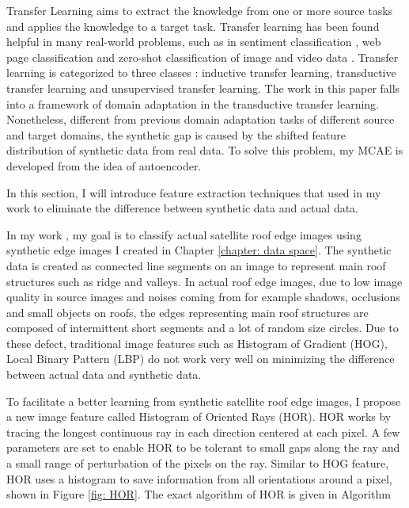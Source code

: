 \documentclass{iitthesis}
\begin{document}
Transfer Learning aims to extract the knowledge from one or more source tasks and applies the knowledge to a target task. Transfer learning has been found helpful in many real-world problems, such as in sentiment classification \cite{Blitzer07Biographies}, web page classification\textcolor{red}{{} }\cite{Sarinnapakorn:2007:CST:1313047.1313197} and zero-shot classification of image and video data \cite{lampert13AwAPAMI,lampert2009zeroshot_dat,yanweiPAMIlatentattrib,yao2011action_part,yanweiembedding,yanweiBMVC,RohrbachCVPR12,rohrbach2010semantic_transfer,RichardNIPS13}. Transfer learning is categorized to three classes \cite{pan2009transfer_survey}: inductive transfer learning, transductive transfer learning and unsupervised transfer learning. The work in this paper falls into a framework of domain adaptation \cite{Ben-David:2010:TLD:1745449.1745461,Weinberger:2009:FHL:1553374.1553516}
in the transductive transfer learning. Nonetheless, different from previous domain adaptation tasks of different source and target domains, the synthetic gap is caused by the shifted feature distribution of synthetic data from real data. To solve this problem, my MCAE is developed from the idea of autoencoder.


In this section, I will introduce feature extraction techniques that used in my work to eliminate the difference between synthetic data and actual data.

 In my work \cite{AndiZang2015}, my goal is to classify actual satellite roof edge images using synthetic edge images I created in Chapter \ref{chapter: data space}. The synthetic data is created as connected line segments on an image to represent main roof structures such as ridge and valleys. In actual roof edge images, due to low image quality in source images and noises coming from for example shadows, occlusions and small objects on roofs, the edges representing main roof structures are composed of intermittent short segments and a lot of random size circles. Due to these defect, traditional image features such as Histogram of Gradient (HOG), Local Binary Pattern (LBP) do not work very well on minimizing the difference between actual data and synthetic data.

To facilitate a better learning from synthetic satellite roof edge images, I propose a new image feature called Histogram of Oriented Rays (HOR). HOR works by tracing the longest continuous ray in each direction centered at each pixel. A few parameters are set to enable HOR to be tolerant to small gaps along the ray and a small range of perturbation of the pixels on the ray. Similar to HOG feature, HOR uses a histogram to save information from all orientations around a pixel, shown in Figure \ref{fig: HOR}. The exact algorithm of HOR is given in Algorithm 
\end{document}
